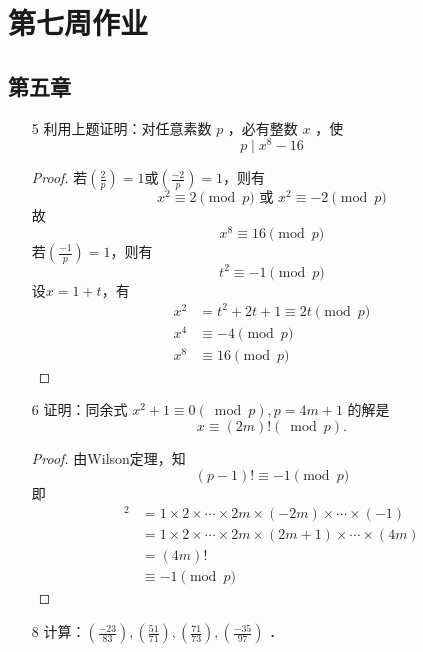 \section{第七周作业}
\subsection*{第五章}

\begin{enumerate}
    \item[5] 利用上题证明：对任意素数 $p$ ，必有整数 $x$ ，使
    $$
    p \mid x^8-16
    $$

    \begin{proof}
        若$\left(\frac{2}{p}\right)=1$或$\left(\frac{-2}{p}\right)=1$，则有
        $$x^2 \equiv 2 \pmod p \text{ 或 } x^2 \equiv -2 \pmod p$$
        故
        $$x^8 \equiv 16 \pmod p$$
        若$\left(\frac{-1}{p}\right)=1$，则有
        $$t^2 \equiv -1 \pmod p$$
        设$x=1+t$，有
        \begin{align*}
        x^2 &= t^2+2t+1 \equiv 2t \pmod p\\
        x^4 &\equiv -4 \pmod p\\
        x^8 &\equiv 16 \pmod p
        \end{align*}
    \end{proof}

    \item[6] 证明：同余式 $x^2+1 \equiv 0(\bmod p), p=4 m+1$ 的解是
    $$
    x \equiv(2 m)!(\bmod p) .
    $$

\begin{proof}
    由Wilson定理，知
    $$(p-1)! \equiv -1 \pmod p$$
    即
\begin{align*}
[(2m)!]^2 &= 1\times2\times\cdots\times2m\times(-2m)\times\cdots\times(-1)\\
&= 1\times2\times\cdots\times2m\times(2m+1)\times\cdots\times(4m)\\
&= (4m)!\\
&\equiv -1 \pmod p
\end{align*}
\end{proof}

    \item[8] 计算：$\left(\frac{-23}{83}\right),\left(\frac{51}{71}\right),\left(\frac{71}{73}\right),\left(\frac{-35}{97}\right)$ ．


\end{enumerate}
